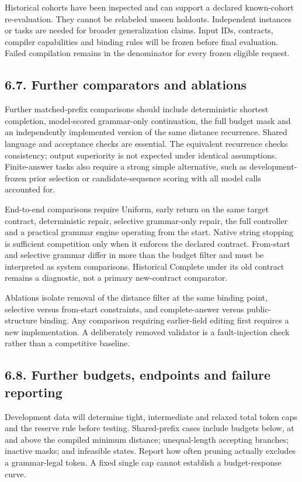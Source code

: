 \documentclass[
  12pt,
  a4paper,
]{article}
\begin{document}
Historical cohorts have been inspected and can support a declared known-cohort re-evaluation. They cannot be relabeled unseen holdouts. Independent instances or tasks are needed for broader generalization claims. Input IDs, contracts, compiler capabilities and binding rules will be frozen before final evaluation. Failed compilation remains in the denominator for every frozen eligible request.

\subsection{6.7. Further comparators and ablations}

Further matched-prefix comparisons should include deterministic shortest completion, model-scored grammar-only continuation, the full budget mask and an independently implemented version of the same distance recurrence. Shared language and acceptance checks are essential. The equivalent recurrence checks consistency; output superiority is not expected under identical assumptions. Finite-answer tasks also require a strong simple alternative, such as development-frozen prior selection or candidate-sequence scoring with all model calls accounted for.

End-to-end comparisons require Uniform, early return on the same target contract, deterministic repair, selective grammar-only repair, the full controller and a practical grammar engine operating from the start. Native string stopping is sufficient competition only when it enforces the declared contract. From-start and selective grammar differ in more than the budget filter and must be interpreted as system comparisons. Historical Complete under its old contract remains a diagnostic, not a primary new-contract comparator.

Ablations isolate removal of the distance filter at the same binding point, selective versus from-start constraints, and complete-answer versus public-structure binding. Any comparison requiring earlier-field editing first requires a new implementation. A deliberately removed validator is a fault-injection check rather than a competitive baseline.

\subsection{6.8. Further budgets, endpoints and failure reporting}

Development data will determine tight, intermediate and relaxed total token caps and the reserve rule before testing. Shared-prefix cases include budgets below, at and above the compiled minimum distance; unequal-length accepting branches; inactive masks; and infeasible states. Report how often pruning actually excludes a grammar-legal token. A fixed single cap cannot establish a budget-response curve.
\end{document}
